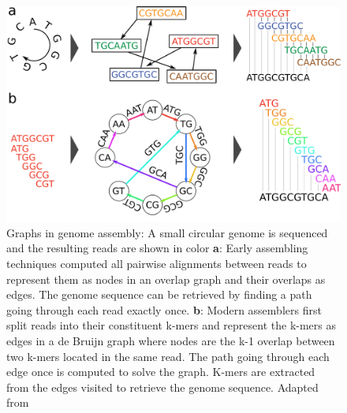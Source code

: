 \begin{figure}
\includegraphics[width=\textwidth]{Parts/Part01/gfx/debruijn.pdf}
\caption{Graphs in genome assembly: A small circular genome is sequenced and the resulting reads are shown in color \textbf{a}: Early assembling techniques computed all pairwise alignments between reads to represent them as nodes in an overlap graph and their overlaps as edges. The genome sequence can be retrieved by finding a path going through each read exactly once. \textbf{b}: Modern assemblers first split reads into their constituent k-mers and represent the k-mers as edges in a de Bruijn graph where nodes are the k-1 overlap between two k-mers located in the same read. The path going through each edge once is computed to solve the graph. K-mers are extracted from the edges visited to retrieve the genome sequence. Adapted from \cite{compeauHowApplyBruijn2011}}
\label{fig:01-03:debruijn}
\end{figure}

